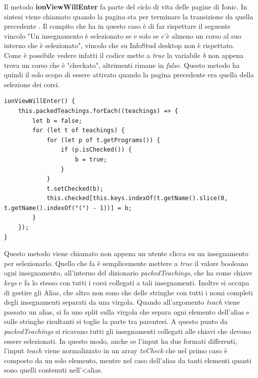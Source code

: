 \documentclass[Lau, oneside, noexaminfo]{sapthesis}%
\begin{document}
Il metodo \textbf{ionViewWillEnter} fa parte del ciclo di vita delle pagine di Ionic. In sintesi viene chiamato quando la pagina sta per terminare la transizione da quella precedente \cite{ref:ionicViewLifeCycle}. Il compito che ha in questo caso è di far rispettare il seguente vincolo "Un insegnamento è selezionato se e solo se c'è almeno un corso al suo interno che è selezionato", vincolo che su InfoStud desktop non è rispettato. Come è possibile vedere infatti il codice mette a \textit{true} la variabile \textit{b} non appena trova un corso che è "checkato", altrimenti rimane in \textit{false}. Questo metodo ha quindi il solo scopo di essere attivato quando la pagina precedente era quella della selezione dei corsi.

\begin{lstlisting}[frame=single]
ionViewWillEnter() {
	this.packedTeachings.forEach((teachings) => {
		let b = false;
		for (let t of teachings) {
			for (let p of t.getPrograms()) {
				if (p.isChecked()) {
					b = true;
				}
			}
			t.setChecked(b);
			this.checked[this.keys.indexOf(t.getName().slice(0, t.getName().indexOf("(") - 1))] = b;
		}
	});
}
\end{lstlisting}

Questo metodo viene chiamato non appena un utente clicca su un insegnamento per selezionarlo. Quello che fa è semplicemente mettere a \textit{true} il valore booleano ogni insegnamento, all'interno del dizionario \textit{packedTeachings}, che ha come chiave \textit{keys} e fa lo stesso con tutti i corsi collegati a tali insegnamenti. Inoltre si occupa di gestire gli Alias, che altro non sono che delle stringhe con tutti i nomi completi degli insegnamenti separati da una virgola. Quando all'argomento \textit{teach} viene passato un alias, si fa uno split sulla virgola che separa ogni elemento dell'alias e sulle stringhe risultanti si toglie la parte tra parentesi. A questo punto da \textit{packedTeachings} si ricavano tutti gli insegnamenti collegati alle chiavi che devono essere selezionati. In questo modo, anche se l'input ha due formati differenti, l'input \textit{teach} viene normalizzato in un array \textit{toCheck} che nel primo caso è composto da un solo elemento, mentre nel caso dell'alias da tanti elementi quanti sono quelli contenuti nell'<alias.
\end{document}

